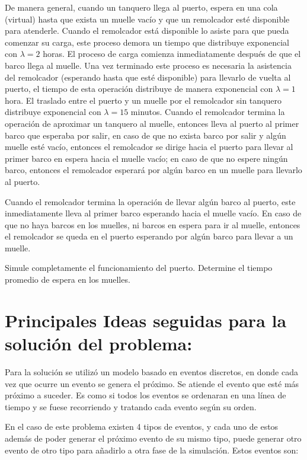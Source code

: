 \documentclass[titlepage,11pt]{scrartcl}
\begin{document}
	De manera general, cuando un tanquero llega al puerto, espera en una cola (virtual) hasta que exista un muelle vacío y que un remolcador esté disponible para atenderle. Cuando el remolcador está disponible lo asiste para que pueda comenzar su carga, este proceso demora un tiempo que distribuye exponencial con $\lambda = 2$ horas. El proceso de carga comienza inmediatamente después de que el barco llega al muelle. Una vez terminado este proceso es necesaria la asistencia del remolcador (esperando hasta que esté disponible) para llevarlo de vuelta al puerto, el tiempo de esta operación distribuye de manera exponencial con $\lambda = 1$ hora. El traslado entre el puerto y un muelle por el remolcador sin tanquero distribuye exponencial con $\lambda = 15$ minutos. Cuando el remolcador termina la operación de aproximar un tanquero al muelle, entonces lleva al puerto al primer barco que esperaba por salir, en caso de que no exista barco por salir y algún muelle esté vacío, entonces el remolcador se dirige hacia el puerto para llevar al primer barco en espera hacia el muelle vacío; en caso de que no espere ningún barco, entonces el remolcador esperará por algún barco en un muelle para llevarlo al puerto. 
	
	Cuando el remolcador termina la operación de llevar algún barco al puerto, este inmediatamente lleva al primer barco esperando hacia el muelle vacío. En caso de que no haya barcos en los muelles, ni barcos en espera para ir al muelle, entonces el remolcador se queda en el puerto esperando por algún barco para llevar a un muelle. 
	
	Simule completamente el funcionamiento del puerto. Determine el tiempo promedio de espera en los muelles.

\section{Principales Ideas seguidas para la solución del problema:}

	Para la solución se utilizó un modelo basado en eventos discretos, en donde cada vez que ocurre un evento se genera el próximo. Se atiende el evento que esté más próximo a suceder. Es como si todos los eventos se ordenaran en una línea de tiempo y se fuese recorriendo y tratando cada evento según su orden.

	En el caso de este problema existen 4 tipos de eventos, y cada uno de estos además de poder generar el próximo evento de su mismo tipo, puede generar otro evento de otro tipo para añadirlo a otra fase de la simulación. Estos eventos son:
	
\end{document}
